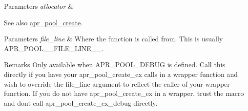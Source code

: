 \begin{DoxyParams}{Parameters}
{\em allocator} & \\
\hline
\end{DoxyParams}
\begin{DoxySeeAlso}{See also}
\hyperlink{group__apr__pools_ga918adf3026c894efeae254a0446aed3b}{apr\+\_\+pool\+\_\+create}. 
\end{DoxySeeAlso}

\begin{DoxyParams}{Parameters}
{\em file\+\_\+line} & Where the function is called from. This is usually A\+P\+R\+\_\+\+P\+O\+O\+L\+\_\+\+\_\+\+F\+I\+L\+E\+\_\+\+L\+I\+N\+E\+\_\+\+\_\+. \\
\hline
\end{DoxyParams}
\begin{DoxyRemark}{Remarks}
Only available when A\+P\+R\+\_\+\+P\+O\+O\+L\+\_\+\+D\+E\+B\+UG is defined. Call this directly if you have your apr\+\_\+pool\+\_\+create\+\_\+ex calls in a wrapper function and wish to override the file\+\_\+line argument to reflect the caller of your wrapper function. If you do not have apr\+\_\+pool\+\_\+create\+\_\+ex in a wrapper, trust the macro and don\textquotesingle{}t call apr\+\_\+pool\+\_\+create\+\_\+ex\+\_\+debug directly. 
\end{DoxyRemark}

